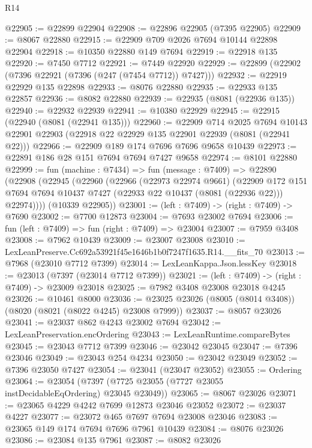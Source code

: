 \begin{lexlean}{R14}
\begin{coremodule}
@22905 := @22899 @22904
@22908 := @22896 @22905 (@7395 @22905)
@22909 := @8067 @22880
@22915 := @22909 @709 @2026 @7694 @10144 @22898 @22904
@22918 := @10350 @22880 @149 @7694
@22919 := @22918 @135
@22920 := @7450 @7712
@22921 := @7449 @22920
@22929 := @22899 (@22902 (@7396 @22921 (@7396 (@247 (@7454 @7712)) @7427)))
@22932 := @22919 @22929 @135 @22898
@22933 := @8076 @22880
@22935 := @22933 @135 @22857
@22936 := @8082 @22880
@22939 := @22935 (@8081 (@22936 @135))
@22940 := @22932 @22939
@22941 := @10380 @22929
@22945 := @22915 (@22940 (@8081 (@22941 @135)))
@22960 := @22909
    @714
    @2025
    @7694
    @10143
    @22901
    @22903
    (@22918 @22 @22929 @135 @22901 @22939 (@8081 (@22941 @22)))
@22966 := @22909 @189 @174 @7696 @7696 @9658 @10439
@22973 := @22891 @186 @28 @151 @7694 @7694 @7427 @9658
@22974 := @8101 @22880
@22999 := fun (machine : @7434) =>
  fun (message : @7409) =>
  @22890
    (@22908
      (@22945
        (@22960
          (@22966
            (@22973 @22974 @9661)
            (@22909
              @172
              @151
              @7694
              @7694
              @10437
              @7427
              (@22933 @22 @10437 (@8081 (@22936 @22)))
              @22974))))
      (@10339 @22905))
@23001 := (left : @7409) -> (right : @7409) -> @7690
@23002 := @7700 @12873
@23004 := @7693 @23002 @7694
@23006 := fun (left : @7409) => fun (right : @7409) => @23004
@23007 := @7959 @3408
@23008 := @7962 @10439
@23009 := @23007 @23008
@23010 := LexLeanPreserve.Cc692a53921f45e1646b1b0f7247f1635.R14.__fits_70
@23013 := @7968 (@23010 @7712 @7399)
@23014 := LexLeanKappa.Json.lessKey
@23018 := @23013 (@7397 (@23014 @7712 @7399))
@23021 := (left : @7409) -> (right : @7409) -> @23009 @23018
@23025 := @7982 @3408 @23008 @23018 @4245
@23026 := @10461 @8000
@23036 := @23025 @23026 (@8005 (@8014 @3408)) (@8020 (@8021 (@8022 @4245) @23008 @7999))
@23037 := @8057 @23026
@23041 := @23037 @862 @4243 @23002 @7694
@23042 := LexLeanPreservation.encOrdering
@23043 := LexLeanRuntime.compareBytes
@23045 := @23043 @7712 @7399
@23046 := @23042 @23045
@23047 := @7396 @23046
@23049 := @23043 @254 @4234
@23050 := @23042 @23049
@23052 := @7396 @23050 @7427
@23054 := @23041 (@23047 @23052)
@23055 := Ordering
@23064 := @23054 (@7397 (@7725 @23055 (@7727 @23055 instDecidableEqOrdering) @23045 @23049))
@23065 := @8067 @23026
@23071 := @23065 @4229 @4242 @7699 @12873 @23046 @23052
@23072 := @23037 @4227
@23077 := @23072 @465 @7697 @7694 @23008 @23046
@23083 := @23065 @149 @174 @7694 @7696 @7961 @10439
@23084 := @8076 @23026
@23086 := @23084 @135 @7961
@23087 := @8082 @23026

\end{coremodule}
\end{lexlean}
